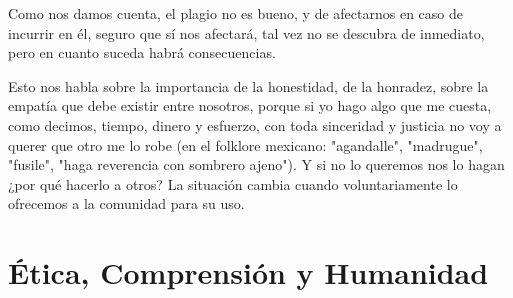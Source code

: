 Como nos damos cuenta, el plagio no es bueno, y de afectarnos en caso de incurrir en él, seguro que sí nos afectará, tal vez no se descubra de inmediato, pero en cuanto suceda habrá consecuencias.

Esto nos habla sobre la importancia de la honestidad, de la honradez, sobre la empatía que debe existir entre nosotros, porque si yo hago algo que me cuesta, como decimos, tiempo, dinero y esfuerzo, con toda sinceridad y justicia no voy a querer que otro me lo robe (en el folklore mexicano: "agandalle", "madrugue", "fusile", "haga reverencia con sombrero ajeno"). Y si no lo queremos nos lo hagan ¿por qué hacerlo a otros? La situación cambia cuando voluntariamente lo ofrecemos a la comunidad para su uso.

\section{Ética, Comprensión y Humanidad}
